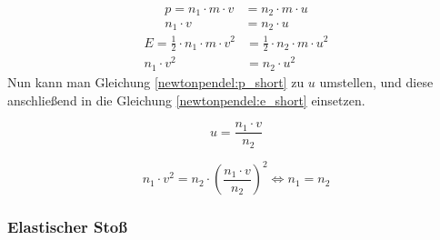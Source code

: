 \documentclass[a4paper]{article}
\begin{document}
				\begin{equation}\label{newtonpendel:p_short}
				\begin{aligned}
					p=n_1\cdot m \cdot v &= n_2\cdot m \cdot u\\
					n_1\cdot v &= n_2 \cdot u
				\end{aligned}
				\end{equation}
				\begin{equation}\label{newtonpendel:e_short}
				\begin{aligned}
					E=\frac{1}{2}\cdot n_1\cdot m \cdot v^2 &= \frac{1}{2}\cdot n_2\cdot m \cdot u^2\\
					n_1 \cdot v^2 &= n_2 \cdot u^2
					\end{aligned}
				\end{equation}
				Nun kann man Gleichung \ref{newtonpendel:p_short} zu $u$ umstellen, und diese anschließend in die Gleichung \ref{newtonpendel:e_short} einsetzen.
			
				\begin{equation}
					u = \frac{n_1\cdot v}{n_2}
				\end{equation}
				
				\begin{equation}
					n_1 \cdot v^2 =n_2 \cdot \left(\frac{n_1\cdot v}{n_2}\right) ^2\Leftrightarrow n_1 = n_2
				\end{equation}

	
			\subsubsection{Elastischer Stoß}
			
\end{document}
